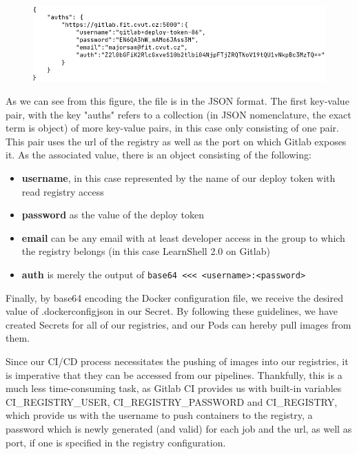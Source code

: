 \documentclass[thesis=B,english]{FITthesis}[2019/12/23]
\begin{document}
\begin{figure}[H]
\centering
\hspace*{-0.6cm}
\includegraphics[scale=0.5]{docker-config}
\end{figure}

As we can see from this figure, the file is in the JSON format. The first key-value pair, with the key "auths" refers to a collection (in JSON nomenclature, the exact term is object) of more key-value pairs, in this case only consisting of one pair. This pair uses the url of the registry as well as the port on which Gitlab exposes it. As the associated value, there is an object consisting of the following:

\begin{itemize}
  \setlength\itemsep{0em}
  \item \textbf{username}, in this case represented by the name of our deploy token with read registry access
  \item \textbf{password} as the value of the deploy token
  \item \textbf{email} can be any email with at least developer access in the group to which the registry belongs (in this case LearnShell 2.0 on Gitlab)
  \item \textbf{auth} is merely the output of \verb|base64 <<< <username>:<password>|
\end{itemize}

Finally, by base64 encoding the Docker configuration file, we receive the desired value of .dockerconfigjson in our Secret. By following these guidelines, we have created Secrets for all of our registries, and our Pods can hereby pull images from them.

Since our CI/CD process necessitates the pushing of images into our registries, it is imperative that  they can be accessed from our pipelines. Thankfully, this is a much less time-consuming task, as Gitlab CI provides us with built-in variables CI\_REGISTRY\_USER, CI\_REGISTRY\_PASSWORD and CI\_REGISTRY, which provide us with the username to push containers to the registry, a password which is newly generated (and valid) for each job and the url, as well as port, if one is specified in the registry configuration.
\end{document}
